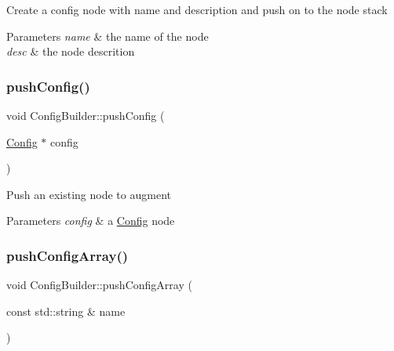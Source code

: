 Create a config node with name and description and push on to the node stack 
\begin{DoxyParams}{Parameters}
{\em name} & the name of the node \\
\hline
{\em desc} & the node descrition \\
\hline
\end{DoxyParams}
\mbox{\label{classtheoria_1_1config_1_1ConfigBuilder_a2dc70e43627e67521bf921152ee3c131}} 
\subsubsection{\texorpdfstring{push\+Config()}{pushConfig()}\hspace{0.1cm}{\footnotesize\ttfamily [2/2]}}
{\footnotesize\ttfamily void Config\+Builder\+::push\+Config (\begin{DoxyParamCaption}\item[{\hyperlink{classtheoria_1_1config_1_1Config}{Config} $\ast$}]{config }\end{DoxyParamCaption})}

Push an existing node to augment 
\begin{DoxyParams}{Parameters}
{\em config} & a \hyperlink{classtheoria_1_1config_1_1Config}{Config} node \\
\hline
\end{DoxyParams}
\mbox{\label{classtheoria_1_1config_1_1ConfigBuilder_a38baf2a30a0be4a5e99969c07223bc9b}} 
\subsubsection{\texorpdfstring{push\+Config\+Array()}{pushConfigArray()}}
{\footnotesize\ttfamily void Config\+Builder\+::push\+Config\+Array (\begin{DoxyParamCaption}\item[{const std\+::string \&}]{name }\end{DoxyParamCaption})}

